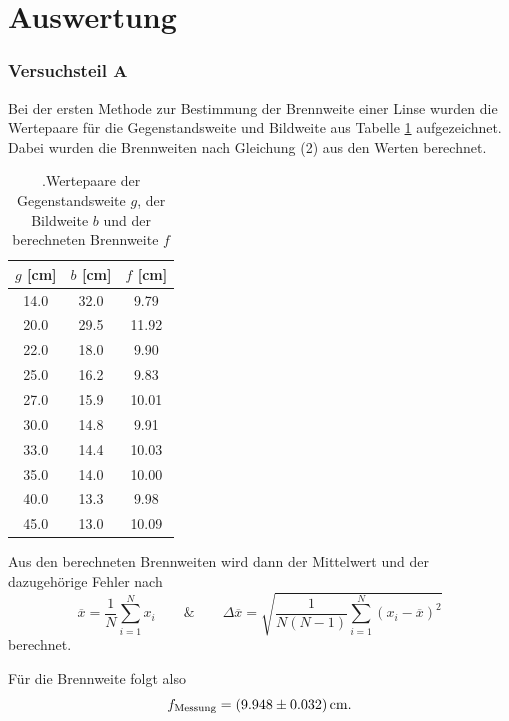 \section{Auswertung}
\subsubsection{Versuchsteil A}
Bei der ersten Methode zur Bestimmung der Brennweite einer Linse wurden die Wertepaare für die Gegenstandsweite und Bildweite aus Tabelle \ref{tab:uno} aufgezeichnet.
Dabei wurden die Brennweiten nach Gleichung (2) aus den Werten berechnet.

\begin{table}[H]
    \begin{center}
      \caption{.Wertepaare der Gegenstandsweite $g$, der Bildweite $b$ und der berechneten Brennweite $f$}
      \label{tab:uno}
      \begin{tabular}{c|c|c} 
        \textbf{$g$ [cm]} & \textbf{$b$ [cm]} & \textbf{$f$ [cm]}\\
        \hline
        14.0 & 32.0 & 9.79 \\
        20.0 & 29.5 & 11.92 \\
        22.0 & 18.0 & 9.90 \\
        25.0 & 16.2 & 9.83 \\
        27.0 & 15.9 & 10.01 \\
        30.0 & 14.8 & 9.91 \\
        33.0 & 14.4 & 10.03 \\
        35.0 & 14.0 & 10.00 \\
        40.0 & 13.3 & 9.98 \\
        45.0 & 13.0 & 10.09
      \end{tabular}
    \end{center}
\end{table}

Aus den berechneten Brennweiten wird dann der Mittelwert und der dazugehörige Fehler nach
\begin{equation}
    \overline{x} = \frac{1}{N} \sum_{i=1}^N x_i \qquad \text{\&} \qquad \Delta \overline{x} = \sqrt{\frac{1}{N(N-1)}\sum \limits_{i=1}^N (x_i-\overline{x})^2}
\end{equation}
berechnet.

Für die Brennweite folgt also
\begin{equation}
    f_\text{Messung} = \SI{9.948 \pm 0.032}{cm}.     \notag
\end{equation}

